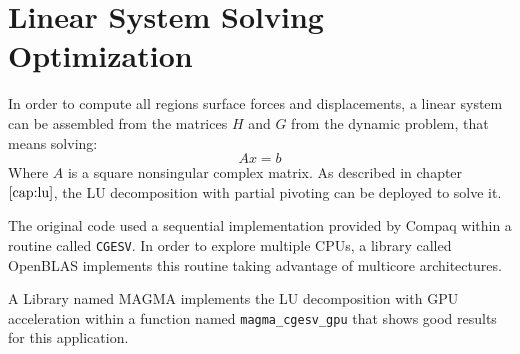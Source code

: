 \section{Linear System Solving Optimization}
In order to compute all regions surface forces and displacements, a linear system can be assembled 
from the matrices $H$ and $G$ from the dynamic problem, that means solving: 
\begin{equation}
	Ax = b
\end{equation}
Where $A$ is a square nonsingular complex matrix. As described in chapter $\ref{cap:lu}$, 
the LU decomposition with partial pivoting can be deployed to solve it.

The original code used a sequential implementation provided by Compaq within a routine called \texttt{CGESV}. In order to explore multiple CPUs,
a library called OpenBLAS implements this routine taking advantage of multicore architectures.  

A Library named MAGMA implements the LU decomposition with GPU acceleration within a function named \texttt{magma\_cgesv\_gpu} that shows good results for this application.

